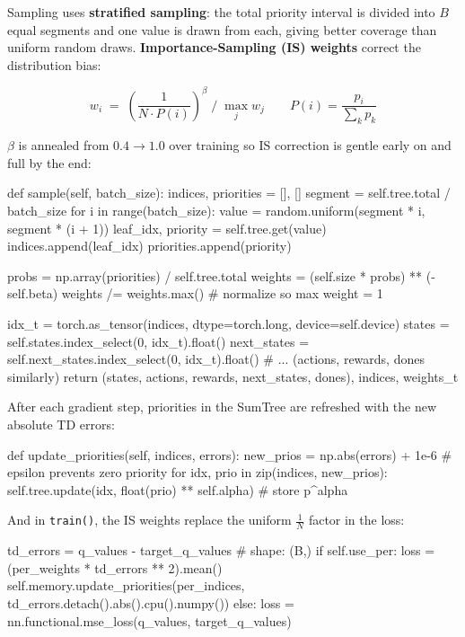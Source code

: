 \documentclass[12pt,a4paper]{report}
\begin{document}
Sampling uses \textbf{stratified sampling}: the total priority interval is divided into
$B$ equal segments and one value is drawn from each, giving better coverage than uniform
random draws.
\textbf{Importance-Sampling (IS) weights} correct the distribution bias:

\[
  w_i \;=\; \left(\frac{1}{N \cdot P(i)}\right)^{\!\beta}
  \;\Big/\;
  \max_j w_j
  \qquad
  P(i) = \frac{p_i}{\sum_k p_k}
\]

$\beta$ is annealed from $0.4 \to 1.0$ over training so IS correction is gentle early on
and full by the end:

\begin{pycode}
def sample(self, batch_size):
    indices, priorities = [], []
    segment = self.tree.total / batch_size
    for i in range(batch_size):
        value = random.uniform(segment * i, segment * (i + 1))
        leaf_idx, priority = self.tree.get(value)
        indices.append(leaf_idx)
        priorities.append(priority)

    probs   = np.array(priorities) / self.tree.total
    weights = (self.size * probs) ** (-self.beta)
    weights /= weights.max()                          # normalize so max weight = 1

    idx_t       = torch.as_tensor(indices, dtype=torch.long, device=self.device)
    states      = self.states.index_select(0, idx_t).float()
    next_states = self.next_states.index_select(0, idx_t).float()
    # ... (actions, rewards, dones similarly)
    return (states, actions, rewards, next_states, dones), indices, weights_t
\end{pycode}

After each gradient step, priorities in the SumTree are refreshed with the new absolute
TD errors:

\begin{pycode}
def update_priorities(self, indices, errors):
    new_prios = np.abs(errors) + 1e-6          # epsilon prevents zero priority
    for idx, prio in zip(indices, new_prios):
        self.tree.update(idx, float(prio) ** self.alpha)   # store p^alpha
\end{pycode}

And in \texttt{train()}, the IS weights replace the uniform $\frac{1}{N}$ factor in the loss:

\begin{pycode}
td_errors = q_values - target_q_values          # shape: (B,)
if self.use_per:
    loss = (per_weights * td_errors ** 2).mean()
    self.memory.update_priorities(per_indices,
                                  td_errors.detach().abs().cpu().numpy())
else:
    loss = nn.functional.mse_loss(q_values, target_q_values)
\end{pycode}
\end{document}
